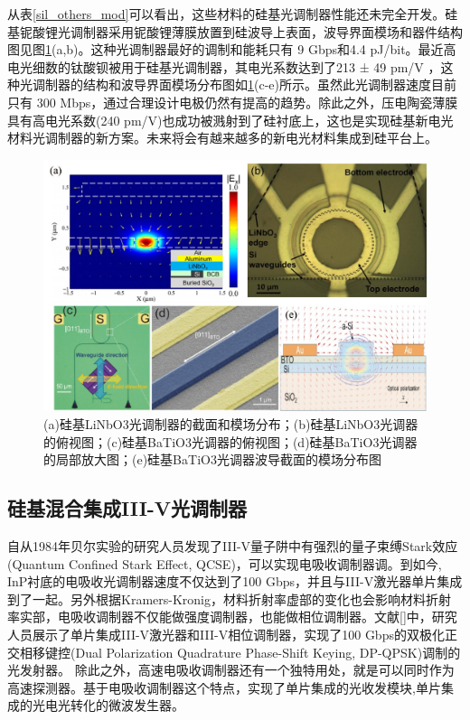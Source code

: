 从表\ref{sil_others_mod}可以看出，这些材料的硅基光调制器性能还未完全开发。硅基铌酸锂光调制器采用铌酸锂薄膜放置到硅波导上表面，波导界面模场和器件结构图见图\ref{fig_othter_mod.jpg}(a,b)。这种光调制器最好的调制和能耗只有 9 Gbps和4.4 pJ/bit。最近高电光细数的钛酸钡被用于硅基光调制器，其电光系数达到了213 ± 49 pm/V \cite{xiong2014active}，这种光调制器的结构和波导界面模场分布图如\ref{fig_othter_mod.jpg}(c-e)所示。虽然此光调制器速度目前只有 300 Mbps，通过合理设计电极仍然有提高的趋势。除此之外，压电陶瓷薄膜具有高电光系数(240 pm/V)也成功被溅射到了硅衬底上\cite{george2015lanthanide}，这也是实现硅基新电光材料光调制器的新方案。未来将会有越来越多的新电光材料集成到硅平台上。
\begin{figure}[htb]
	\centering
	\includegraphics[width=12cm]{./Pictures/fig_othter_mod.jpg}
	\caption{ (a)硅基LiNbO3光调制器的截面和模场分布\cite{chen2014hybrid}；(b)硅基LiNbO3光调器的俯视图\cite{palmer2014high}；(c)硅基BaTiO3光调器的俯视图\cite{xiong2014active}；(d)硅基BaTiO3光调器的局部放大图\cite{xiong2014active}；(e)硅基BaTiO3光调器波导截面的模场分布图\cite{xiong2014active}}
	\label{fig_othter_mod.jpg}
\end{figure}
\subsection{硅基混合集成III-V光调制器}
自从1984年贝尔实验的研究人员发现了III-V量子阱中有强烈的量子束缚Stark效应(Quantum Confined Stark Effect, QCSE)，可以实现电吸收调制器调\cite{miller1984band, wood1984high}。到如今, InP衬底的电吸收光调制器速度不仅达到了100 Gbps，并且与III-V激光器单片集成到了一起\cite{chacinski2009monolithically, kazmierski2009100}。另外根据Kramers-Kronig，材料折射率虚部的变化也会影响材料折射率实部，电吸收调制器不仅能做强度调制器，也能做相位调制器。文献[]中，研究人员展示了单片集成III-V激光器和III-V相位调制器，实现了100 Gbps的双极化正交相移键控(Dual Polarization Quadrature Phase-Shift Keying, DP-QPSK)调制的光发射器\cite{poirier2015inp}。 除此之外，高速电吸收调制器还有一个独特用处，就是可以同时作为高速探测器\cite{miller1985electric}。基于电吸收调制器这个特点，实现了单片集成的光收发模块\cite{welstand1996dual,chen2016wavelength},单片集成的光电光转化的微波发生器\cite{zhou2014compact}。

